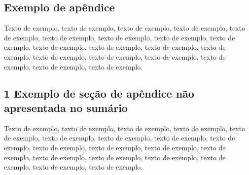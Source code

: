 \documentclass[
	12pt,				%
	oneside,			%
	a4paper,			%
	english,			%
	brazil				%
	]{abntex2ppgsi}
\begin{document}


%
%


\begin{apendicesenv}


%
%
%
\chapter{Exemplo de apêndice}

Texto de exemplo, texto de exemplo, texto de exemplo, texto de exemplo, texto de exemplo, texto de exemplo, texto de exemplo, texto de exemplo, texto de exemplo, texto de exemplo, texto de exemplo, texto de exemplo, texto de exemplo, texto de exemplo, texto de exemplo, texto de exemplo, texto de exemplo, texto de exemplo, texto de exemplo.

\section*{1 Exemplo de seção de apêndice não apresentada no sumário}

Texto de exemplo, texto de exemplo, texto de exemplo, texto de exemplo, texto de exemplo, texto de exemplo, texto de exemplo, texto de exemplo, texto de exemplo, texto de exemplo, texto de exemplo, texto de exemplo, texto de exemplo, texto de exemplo, texto de exemplo, texto de exemplo, texto de exemplo, texto de exemplo, texto de exemplo.


\end{apendicesenv}
\end{document}

